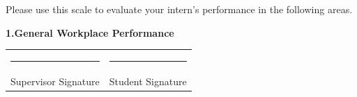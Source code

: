 \documentclass[
  12pt,
  a4paperpaper,
]{report}
\begin{document}
\begin{center}
\begin{minipage}{\textwidth}
\vspace{0.15cm}

{\small Please use this scale to evaluate your intern's performance in the following areas.}

\vspace{0.2cm}

\noindent\textbf{1.\quad General Workplace Performance}

\vspace{0.2cm}
\vspace{1.5cm}
\noindent\begin{tabularx}{\textwidth}{@{}X X@{}}
\rule{6cm}{0.4pt} & \rule{6cm}{0.4pt} \\
Supervisor Signature & Student Signature \\
\end{tabularx}
\vspace*{1cm}

\end{minipage}
\end{center}
\end{document}
